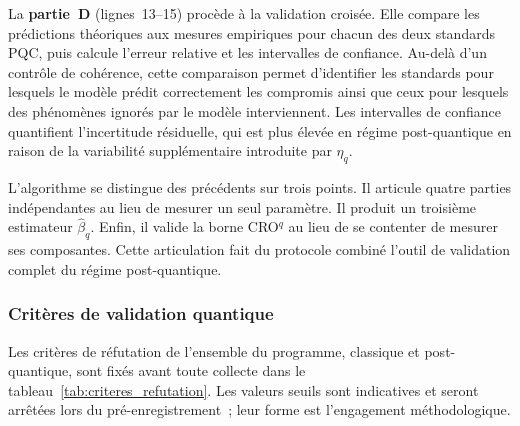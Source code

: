 \begin{sloppypar}
La \textbf{partie~D} (lignes~13--15) proc\`ede \`a la validation
crois\'ee. Elle compare les pr\'edictions th\'eoriques aux mesures
empiriques pour chacun des deux standards PQC, puis calcule l'erreur
relative et les intervalles de confiance. Au-del\`a d'un contr\^ole de
coh\'erence, cette comparaison permet d'identifier les
standards pour lesquels le mod\`ele pr\'edit correctement les
compromis ainsi que ceux pour lesquels des ph\'enom\`enes ignor\'es par
le mod\`ele interviennent. Les intervalles de confiance quantifient
l'incertitude r\'esiduelle, qui est plus \'elev\'ee en r\'egime
post-quantique en raison de la variabilit\'e suppl\'ementaire introduite
par $\eta_q$.

L'algorithme se distingue des pr\'ec\'edents sur trois points. Il
articule quatre parties ind\'ependantes au lieu de mesurer un seul
param\`etre. Il produit un troisi\`eme estimateur $\hat\beta_q$. Enfin, il valide la borne
CRO$^q$ au lieu de se contenter de mesurer ses composantes. Cette articulation
fait du protocole combin\'e l'outil de validation complet du r\'egime
post-quantique.

\subsubsection{Crit\`eres de validation quantique}
\label{subsubsec:criteres_validation_quantique}

Les crit\`eres de r\'efutation de l'ensemble du programme, classique et
post-quantique, sont fix\'es avant toute collecte dans le
tableau~\ref{tab:criteres_refutation}. Les valeurs seuils sont indicatives et
seront arr\^et\'ees lors du pr\'e-enregistrement~; leur forme est
l'engagement m\'ethodologique.


\end{sloppypar}
